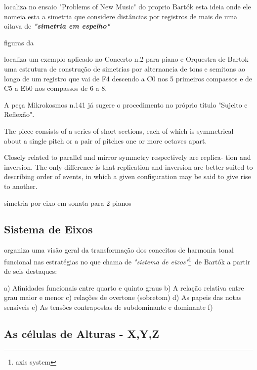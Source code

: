 \documentclass[
	12pt,				%
	openright,			%
	twoside,			%
	a4paper,			%
	english,			%
	french,				%
	spanish,			%
	brazil				%
	]{abntex2}
\begin{document}
 localiza no ensaio "Problems of New Music" do proprio Bartók esta ideia onde ele nomeia esta a simetria que considere distâncias por registros de mais de uma oitava de \textit{\textbf{"simetria em espelho"}}


figuras da  \cite[p. 187]{bernard1986space}

 localiza um exemplo aplicado no Concerto n.2 para piano e Orquestra de Bartok uma estrutura de construção de simetrias por alternancia de tons e semitons ao longo de um registro que vai de F4 descendo a C0 nos 5 primeiros compassos e de C5 a Eb0 nos compassos de 6 a 8.

A peça Mikrokosmos n.141 já sugere o procedimento no próprio título "Sujeito e Reflexão".

The piece consists of a series of short sections, each of which is symmetrical about a single
pitch or a pair of pitches one or more octaves apart.\cite[p. 187]{bernard1986space}

Closely related to parallel and mirror symmetry respectively are replica-
tion and inversion. The only difference is that replication and inversion are
better suited to describing order of events, in which a given configuration
may be said to give rise to another.\cite[p. 190]{bernard1986space}


simetria por eixo em sonata para 2 pianos \cite[p. 195-198]{bernard1986space}



\subsection{Sistema de Eixos}

 organiza uma visão geral da transformação dos conceitos de harmonia tonal funcional nas estratégias no que chama de \textit{"sistema de eixos"}\footnote{axis system}\ de Bartók a partir de seis destaques:

a) Afinidades funcionais entre quarto e quinto graus
b) A relação relativa entre grau maior e menor
c) relações de overtone (sobretom)
d) As papeis das notas sensíveis
e) As tensões contrapostas de subdominante e dominante 
f) 

\cite{lendvai1971bela}




\subsection{As células de Alturas - X,Y,Z}
\end{document}
